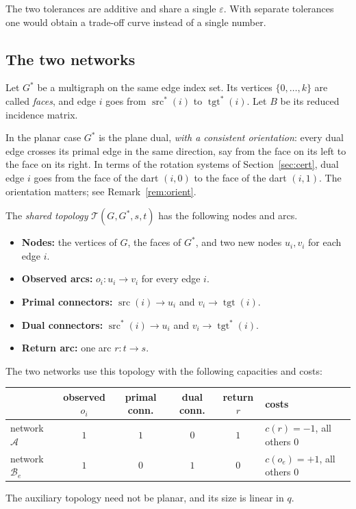 \documentclass[11pt]{amsart}
\theoremstyle{plain}
\theoremstyle{definition}
\theoremstyle{remark}
\newcommand{\src}{\operatorname{src}}
\newcommand{\tgt}{\operatorname{tgt}}
\begin{document}
The two tolerances are additive and share a single $\varepsilon$. With separate tolerances one would obtain a
trade-off curve instead of a single number.

\subsection{The two networks}
Let $G^\ast$ be a multigraph on the same edge index set. Its vertices $\{0,\dots,k\}$ are called \emph{faces}, and
edge $i$ goes from $\src^\ast(i)$ to $\tgt^\ast(i)$. Let $B$ be its reduced incidence matrix.

In the planar case $G^\ast$ is the plane dual, \emph{with a consistent orientation}: every dual edge crosses its
primal edge in the same direction, say from the face on its left to the face on its right. In terms of the
rotation systems of Section~\ref{sec:cert}, dual edge $i$ goes from the face of the dart $(i,0)$ to the face of the
dart $(i,1)$. The orientation matters; see Remark~\ref{rem:orient}.

The \emph{shared topology} $\mathcal T(G,G^\ast,s,t)$ has the following nodes and arcs.
\begin{itemize}
\item \textbf{Nodes:} the vertices of $G$, the faces of $G^\ast$, and two new nodes $u_i,v_i$ for each edge $i$.
\item \textbf{Observed arcs:} $o_i\colon u_i\to v_i$ for every edge $i$.
\item \textbf{Primal connectors:} $\src(i)\to u_i$ and $v_i\to\tgt(i)$.
\item \textbf{Dual connectors:} $\src^\ast(i)\to u_i$ and $v_i\to\tgt^\ast(i)$.
\item \textbf{Return arc:} one arc $r\colon t\to s$.
\end{itemize}
The two networks use this topology with the following capacities and costs:
\begin{center}
\begin{tabular}{lccccl}
\toprule
 & observed $o_i$ & primal conn. & dual conn. & return $r$ & costs\\
\midrule
network $\mathcal A$ & $1$ & $1$ & $0$ & $1$ & $c(r)=-1$, all others $0$\\
network $\mathcal B_e$ & $1$ & $0$ & $1$ & $0$ & $c(o_e)=+1$, all others $0$\\
\bottomrule
\end{tabular}
\end{center}
The auxiliary topology need not be planar, and its size is linear in $q$.
\end{document}
